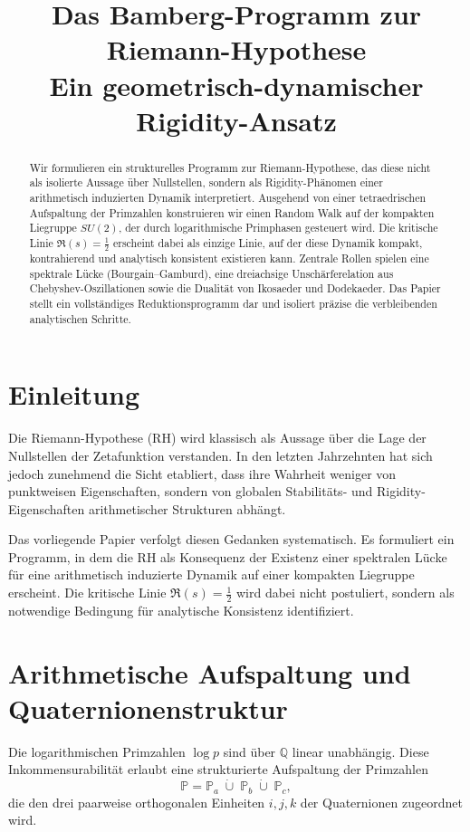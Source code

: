 \documentclass[11pt]{article}
\title{\textbf{Das Bamberg-Programm zur Riemann-Hypothese}\\
\large Ein geometrisch-dynamischer Rigidity-Ansatz}
\author{ }
\date{}
\begin{document}
\maketitle

\begin{abstract}
Wir formulieren ein strukturelles Programm zur Riemann-Hypothese, das diese nicht als isolierte Aussage über Nullstellen,
sondern als Rigidity-Phänomen einer arithmetisch induzierten Dynamik interpretiert.
Ausgehend von einer tetraedrischen Aufspaltung der Primzahlen konstruieren wir einen Random Walk auf der kompakten Liegruppe
$SU(2)$, der durch logarithmische Primphasen gesteuert wird.
Die kritische Linie $\Re(s)=\tfrac12$ erscheint dabei als einzige Linie, auf der diese Dynamik kompakt, kontrahierend und analytisch konsistent existieren kann.
Zentrale Rollen spielen eine spektrale Lücke (Bourgain--Gamburd),
eine dreiachsige Unschärferelation aus Chebyshev-Oszillationen
sowie die Dualität von Ikosaeder und Dodekaeder.
Das Papier stellt ein vollständiges Reduktionsprogramm dar und isoliert präzise die verbleibenden analytischen Schritte.
\end{abstract}

\section{Einleitung}

Die Riemann-Hypothese (RH) wird klassisch als Aussage über die Lage der Nullstellen der Zetafunktion verstanden.
In den letzten Jahrzehnten hat sich jedoch zunehmend die Sicht etabliert,
dass ihre Wahrheit weniger von punktweisen Eigenschaften,
sondern von globalen Stabilitäts- und Rigidity-Eigenschaften arithmetischer Strukturen abhängt.

Das vorliegende Papier verfolgt diesen Gedanken systematisch.
Es formuliert ein Programm, in dem die RH als Konsequenz der Existenz einer spektralen Lücke
für eine arithmetisch induzierte Dynamik auf einer kompakten Liegruppe erscheint.
Die kritische Linie $\Re(s)=\tfrac12$ wird dabei nicht postuliert,
sondern als notwendige Bedingung für analytische Konsistenz identifiziert.

\section{Arithmetische Aufspaltung und Quaternionenstruktur}

Die logarithmischen Primzahlen $\log p$ sind über $\mathbb{Q}$ linear unabhängig.
Diese Inkommensurabilität erlaubt eine strukturierte Aufspaltung der Primzahlen
\[
\mathbb{P} = \mathbb{P}_a \;\dot\cup\; \mathbb{P}_b \;\dot\cup\; \mathbb{P}_c,
\]
die den drei paarweise orthogonalen Einheiten $i,j,k$ der Quaternionen zugeordnet wird.
\end{document}
